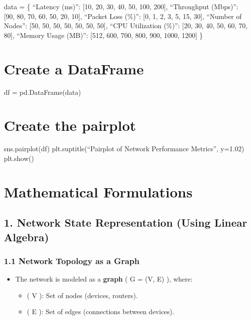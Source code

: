 \documentclass[11pt]{article}
\providecommand{\tightlist}{%
      \setlength{\itemsep}{0pt}\setlength{\parskip}{0pt}}
\begin{document}
data = \{ ``Latency (ms)'': {[}10, 20, 30, 40, 50, 100, 200{]},
``Throughput (Mbps)'': {[}90, 80, 70, 60, 50, 20, 10{]}, ``Packet Loss
(\%)'': {[}0, 1, 2, 3, 5, 15, 30{]}, ``Number of Nodes'': {[}50, 50, 50,
50, 50, 50, 50{]}, ``CPU Utilization (\%)'': {[}20, 30, 40, 50, 60, 70,
80{]}, ``Memory Usage (MB)'': {[}512, 600, 700, 800, 900, 1000, 1200{]}
\}

\hypertarget{create-a-dataframe}{%
\section{Create a DataFrame}\label{create-a-dataframe}}

df = pd.DataFrame(data)

\hypertarget{create-the-pairplot}{%
\section{Create the pairplot}\label{create-the-pairplot}}

sns.pairplot(df) plt.suptitle(``Pairplot of Network Performance
Metrics'', y=1.02) plt.show()

    \hypertarget{mathematical-formulations}{%
\section{\texorpdfstring{\textbf{Mathematical
Formulations}}{Mathematical Formulations}}\label{mathematical-formulations}}

\hypertarget{network-state-representation-using-linear-algebra}{%
\subsection{\texorpdfstring{\textbf{1. Network State Representation
(Using Linear
Algebra)}}{1. Network State Representation (Using Linear Algebra)}}\label{network-state-representation-using-linear-algebra}}

\hypertarget{network-topology-as-a-graph}{%
\subsubsection{\texorpdfstring{\textbf{1.1 Network Topology as a
Graph}}{1.1 Network Topology as a Graph}}\label{network-topology-as-a-graph}}

\begin{itemize}
\tightlist
\item
  The network is modeled as a \textbf{graph} ( G = (V, E) ), where:

  \begin{itemize}
  \tightlist
  \item
    ( V ): Set of nodes (devices, routers).
  \item
    ( E ): Set of edges (connections between devices).
  \end{itemize}
\end{itemize}
\end{document}
